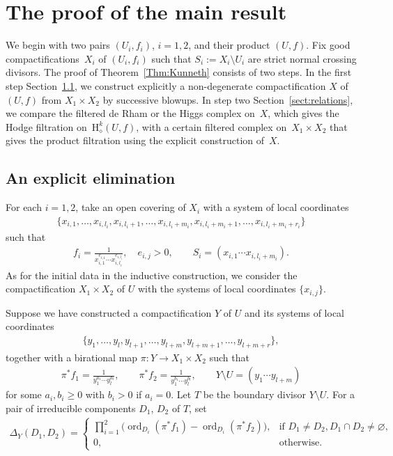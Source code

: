 \documentclass[11pt]{article}
\newcommand{\coH}{\mathrm{H}}
\newcommand{\dRH}{\diamond}
\newcommand{\cpt}{compactification}
\newcommand{\ord}{\operatorname{ord}}
\begin{document}
\section{The proof of the main result}\label{sect:Resolution}

We begin with two pairs $(U_i,f_i)$, $i=1,2$, and their product $(U,f)$. Fix good {\cpt}s~$X_i$ of $(U_i,f_i)$ such that $S_i := X_i\setminus U_i$ are strict normal crossing divisors. The proof of Theorem~\ref{Thm:Kunneth} consists of two steps. In the first step Section~\ref{sect:elim}, we construct explicitly a non-degenerate {\cpt} $X$ of~$(U,f)$ from $X_1\times X_2$ by successive blowups. In step two Section~\ref{sect:relations}, we compare the filtered de Rham or the Higgs complex on~$X$, which gives the Hodge filtration on~$\coH_\dRH^k(U,f)$, with a certain filtered complex on~$X_1\times X_2$ that gives the product filtration using the explicit construction of~$X$.

\subsection{An explicit elimination}\label{sect:elim}

For each $i=1,2$, take an open covering of $X_i$ with a system of local coordinates
\begin{gather*} \{ x_{i,1},\dots, x_{i,l_i}, 	x_{i,l_i+1},\dots,x_{i,l_i+m_i}, 	x_{i,l_i+m_i+1},\dots,x_{i,l_i+m_i+r_i} \} \end{gather*}
such that
\begin{gather*} f_i = \frac{1}{x_{i,1}^{e_{i,1}}\cdots x_{i,l_i}^{e_{i,l_i}}}, \quad e_{i,j} > 0, \qquad S_i = (x_{i,1}\cdots x_{i,l_i+m_i}). \end{gather*}
As for the initial data in the inductive construction, we consider the {\cpt} $X_1\times X_2$ of $U$ with the systems of local coordinates $\{x_{i,j}\}$.

Suppose we have constructed a {\cpt} $Y$ of $U$ and its systems of local coordinates
\begin{gather}\label{eq:Y_LocCoor}
\{ y_1,\dots, y_l, y_{l+1}, \dots, y_{l+m},	y_{l+m+1}, \dots, y_{l+m+r} \},
\end{gather}
together with a birational map $\pi\colon Y \to X_1\times X_2$ such that
\begin{gather}\label{eq:Y_LocBeh}
\pi^*f_1 = \frac{1}{y_1^{a_1}\cdots y_l^{a_l}}, \qquad \pi^*f_2 = \frac{1}{y_1^{b_1}\cdots y_l^{b_l}}, \qquad Y\setminus U = (y_1\cdots y_{l+m})
\end{gather}
for some $a_i,b_i \geq 0$ with $b_i >0$ if $a_i = 0$. Let $T$ be the boundary divisor $Y\setminus U$. For a pair of irreducible components $D_1$, $D_2$ of $T$, set
\begin{gather*} \Delta_Y(D_1,D_2) = \begin{cases}
\displaystyle \prod_{i=1}^2\big(\ord_{D_i}(\pi^*f_1)-\ord_{D_i}(\pi^*f_2)\big), 	& \text{if $D_1\neq D_2, D_1\cap D_2 \neq \varnothing$}, \\
0, & \text{otherwise}. \end{cases}\end{gather*}
\end{document}
